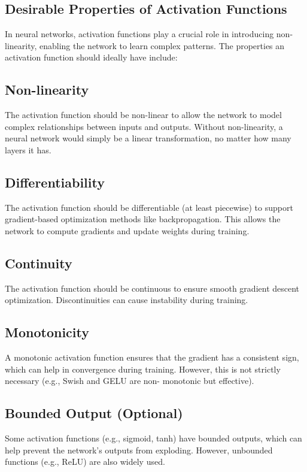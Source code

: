\begin{notechapter}
\chapter{Desirable Properties of Activation Functions}\label{ch:activation-properties}

In neural networks, activation functions play a crucial 
role in introducing non-linearity, enabling the network 
to learn complex patterns. The properties an activation 
function should ideally have include:

\section{Non-linearity}
The activation function should be non-linear to allow 
the network to model complex relationships between 
inputs and outputs. Without non-linearity, a neural 
network would simply be a linear transformation, no 
matter how many layers it has.

\section{Differentiability}
The activation function should be differentiable (at 
least piecewise) to support gradient-based optimization 
methods like backpropagation. This allows the network 
to compute gradients and update weights during training.

\section{Continuity}
The activation function should be continuous to ensure 
smooth gradient descent optimization. Discontinuities 
can cause instability during training.

\section{Monotonicity}
A monotonic activation function ensures that the 
gradient has a consistent sign, which can help in 
convergence during training. However, this is not 
strictly necessary (e.g., Swish and GELU are non-
monotonic but effective).

\section{Bounded Output (Optional)}
Some activation functions (e.g., sigmoid, tanh) have 
bounded outputs, which can help prevent the network's 
outputs from exploding. However, unbounded functions 
(e.g., ReLU) are also widely used.


\end{notechapter}
